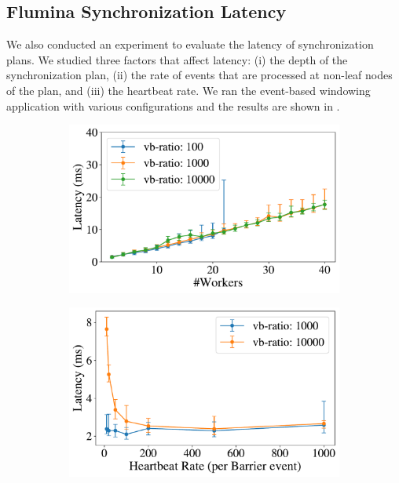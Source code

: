 \subsection{Flumina Synchronization Latency}
\label{dgs:ssec:latency-eval}

We also conducted an experiment to evaluate the latency of synchronization plans. We studied three factors that affect latency: (i) the depth of the synchronization plan, (ii) the rate of events that are processed at non-leaf nodes of the plan, and (iii) the heartbeat rate. We ran the event-based windowing application with various configurations and the results are shown in .
\begin{figure}[t]
    \centering
    \begin{subfigure}[t]{0.45\columnwidth}
      \includegraphics[width=\textwidth]{figures/dgs/synchronization_cost_ratios_nodes}
    \end{subfigure}
    \begin{subfigure}[t]{0.45\columnwidth}
      \includegraphics[width=\textwidth]{figures/dgs/synchronization_cost_heartbeats_ratios}

\end{subfigure}
\end{figure}
